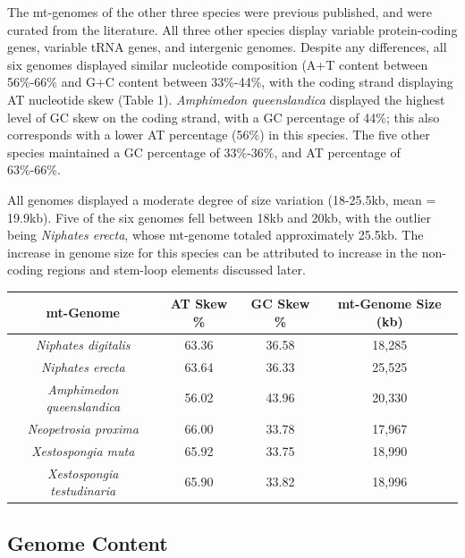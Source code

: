 \documentclass[../main.tex]{subfiles}
\begin{document}
The mt-genomes of the other three species were previous published, and were curated from the literature. All three other species display variable protein-coding genes, variable tRNA genes, and intergenic genomes. Despite any differences, all six genomes displayed similar nucleotide composition (A+T content between 56\%-66\% and G+C content between 33\%-44\%, with the coding strand displaying AT nucleotide skew (Table 1). \emph{Amphimedon queenslandica} displayed the highest level of GC skew on the coding strand, with a GC percentage of 44\%; this also corresponds with a lower AT percentage (56\%) in this species. The five other species maintained a GC percentage of 33\%-36\%, and AT percentage of 63\%-66\%.

All genomes displayed a moderate degree of size variation (18-25.5kb, mean = 19.9kb). Five of the six genomes fell between 18kb and 20kb, with the outlier being \emph{Niphates erecta}, whose mt-genome totaled approximately 25.5kb. The increase in genome size for this species can be attributed to increase in the non-coding regions and stem-loop elements discussed later.

\begin{center}
\begin{tabular}{ |c|c|c|c| } 
 \hline
 \textbf{mt-Genome}& \textbf{AT Skew \%} & \textbf{GC Skew \%} & \textbf{mt-Genome Size (kb)}\\
 \hline

\emph{Niphates digitalis}  & 63.36 & 36.58 & 18,285\\
\hline
\emph{Niphates erecta} & 63.64 & 36.33 & 25,525\\
\hline
\emph{  Amphimedon queenslandica  } & 56.02 & 43.96 & 20,330\\
\hline
\emph{Neopetrosia proxima} & 66.00 & 33.78 & 17,967\\
\hline
\emph{Xestospongia muta} & 65.92 & 33.75 & 18,990\\
\hline
\emph{Xestospongia testudinaria} & 65.90 & 33.82 & 18,996\\
\hline
\end{tabular}
\end{center}

\subsection{Genome Content}
\end{document}
